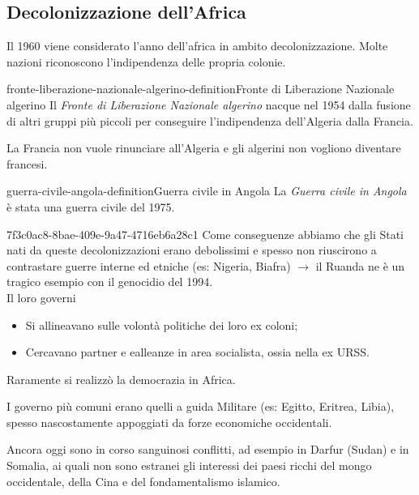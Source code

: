 \documentclass[preview]{standalone}
\begin{document}
\subsection{Decolonizzazione dell'Africa}

\begin{plainhtml}
    Il 1960 viene considerato l'anno dell'africa in ambito decolonizzazione.
    Molte nazioni riconoscono l'indipendenza delle propria colonie.
\end{plainhtml}

\begin{snippetdefinition}{fronte-liberazione-nazionale-algerino-definition}{Fronte di Liberazione Nazionale algerino}
    Il \textit{Fronte di Liberazione Nazionale algerino}
    nacque nel 1954 dalla fusione di altri gruppi più piccoli per conseguire l'indipendenza
    dell'Algeria dalla Francia. 
\end{snippetdefinition}

\begin{plainhtml}
    La Francia non vuole rinunciare all'Algeria e gli algerini non vogliono diventare francesi.
\end{plainhtml}

\begin{snippetdefinition}{guerra-civile-angola-definition}{Guerra civile in Angola}
    La \textit{Guerra civile in Angola} è stata una guerra civile del 1975.
\end{snippetdefinition}

\begin{snippet}{7f3c0ac8-8bae-409e-9a47-4716eb6a28c1}
    Come conseguenze abbiamo che gli Stati nati da queste decolonizzazioni
    erano debolissimi e spesso non riuscirono a
    contrastare guerre interne ed etniche (es: Nigeria, Biafra)
    \(\rightarrow\) il Ruanda ne è un tragico esempio con il genocidio del 1994.
    \\
    Il loro governi
    \begin{itemize}
        \item Si allineavano sulle volontà politiche dei loro ex coloni;
        \item Cercavano partner e ealleanze in area socialista, ossia nella ex URSS.
    \end{itemize}
    Raramente si realizzò la democrazia in Africa.

    I governo più comuni erano quelli a guida Militare (es: Egitto, Eritrea, Libia),
    spesso nascostamente appoggiati da forze economiche occidentali.

    Ancora oggi sono in corso sanguinosi conflitti, ad esempio in Darfur (Sudan)
    e in Somalia, ai quali non sono estranei gli interessi dei paesi ricchi del mongo
    occidentale, della Cina e del fondamentalismo islamico.
\end{snippet}
\end{document}
